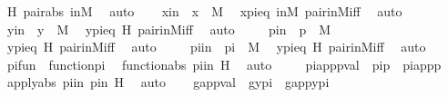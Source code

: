 \begin{isabellebody}
\ H\ pair{\isacharunderscore}{\kern0pt}abs\ inM\ \isamarkupfalse%
\ auto\isanewline
\ \ \isamarkupfalse%
\ xin\ {\isacharcolon}{\kern0pt}\ {\isachardoublequoteopen}x\ {\isasymin}\ M{\isachardoublequoteclose}\ \isamarkupfalse%
\ x{\isacharunderscore}{\kern0pt}pi{\isacharunderscore}{\kern0pt}eq\ inM\ pair{\isacharunderscore}{\kern0pt}in{\isacharunderscore}{\kern0pt}M{\isacharunderscore}{\kern0pt}iff\ \isamarkupfalse%
\ auto\ \isanewline
\ \ \isamarkupfalse%
\ yin\ {\isacharcolon}{\kern0pt}\ {\isachardoublequoteopen}y\ {\isasymin}\ M{\isachardoublequoteclose}\ \isamarkupfalse%
\ y{\isacharunderscore}{\kern0pt}pi{\isacharunderscore}{\kern0pt}eq\ H\ pair{\isacharunderscore}{\kern0pt}in{\isacharunderscore}{\kern0pt}M{\isacharunderscore}{\kern0pt}iff\ \isamarkupfalse%
\ auto\ \isanewline
\ \ \isamarkupfalse%
\ pin\ {\isacharcolon}{\kern0pt}\ {\isachardoublequoteopen}p\ {\isasymin}\ M{\isachardoublequoteclose}\ \isamarkupfalse%
\ y{\isacharunderscore}{\kern0pt}pi{\isacharunderscore}{\kern0pt}eq\ H\ pair{\isacharunderscore}{\kern0pt}in{\isacharunderscore}{\kern0pt}M{\isacharunderscore}{\kern0pt}iff\ \isamarkupfalse%
\ auto\ \isanewline
\ \ \isamarkupfalse%
\ piin\ {\isacharcolon}{\kern0pt}\ {\isachardoublequoteopen}pi\ {\isasymin}\ M{\isachardoublequoteclose}\ \isamarkupfalse%
\ y{\isacharunderscore}{\kern0pt}pi{\isacharunderscore}{\kern0pt}eq\ H\ pair{\isacharunderscore}{\kern0pt}in{\isacharunderscore}{\kern0pt}M{\isacharunderscore}{\kern0pt}iff\ \isamarkupfalse%
\ auto\ \isanewline
\ \ \isamarkupfalse%
\ pifun\ {\isacharcolon}{\kern0pt}\ {\isachardoublequoteopen}function{\isacharparenleft}{\kern0pt}pi{\isacharparenright}{\kern0pt}{\isachardoublequoteclose}\ \isamarkupfalse%
\ function{\isacharunderscore}{\kern0pt}abs\ piin\ H\ \isamarkupfalse%
\ auto\ \isanewline
\ \ \isamarkupfalse%
\ pi{\isacharunderscore}{\kern0pt}app{\isacharunderscore}{\kern0pt}p{\isacharunderscore}{\kern0pt}val\ {\isacharcolon}{\kern0pt}\ {\isachardoublequoteopen}pi{\isacharbackquote}{\kern0pt}p\ {\isacharequal}{\kern0pt}\ pi{\isacharunderscore}{\kern0pt}app{\isacharunderscore}{\kern0pt}p{\isachardoublequoteclose}\ \isamarkupfalse%
\ apply{\isacharunderscore}{\kern0pt}abs\ piin\ pin\ H\ \isamarkupfalse%
\ auto\isanewline
\ \ \isamarkupfalse%
\ g{\isacharunderscore}{\kern0pt}app{\isacharunderscore}{\kern0pt}val\ {\isacharcolon}{\kern0pt}\ {\isachardoublequoteopen}g{\isacharbackquote}{\kern0pt}{\isacharless}{\kern0pt}y{\isacharcomma}{\kern0pt}pi{\isachargreater}{\kern0pt}\ {\isacharequal}{\kern0pt}\ g{\isacharunderscore}{\kern0pt}app{\isacharunderscore}{\kern0pt}y{\isacharunderscore}{\kern0pt}pi{\isachardoublequoteclose}\ \ \ \ \isanewline

\end{isabellebody}
